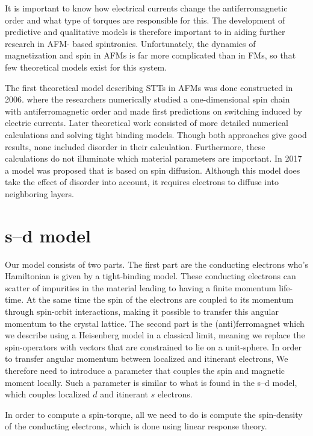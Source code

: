 It is important to know how electrical currents change the antiferromagnetic order and what
type of torques are responsible for this. The development of predictive and qualitative models is therefore important to in aiding further research in AFM- based spintronics.
Unfortunately, the dynamics of magnetization and spin in AFMs is far more complicated
than in FMs, so that few theoretical models exist for this system.

The first theoretical model describing STTs in AFMs was done constructed in 2006. where
the researchers numerically studied a one-dimensional spin chain with antiferromagnetic
order and made first predictions on switching induced by electric currents. Later
theoretical work consisted of more detailed numerical calculations and solving tight binding
models. Though both approaches give good results, none included disorder in their
calculation. Furthermore, these calculations do not illuminate which material
parameters are important. In 2017 a model was proposed that is based on spin
diffusion. Although this model does take the effect of disorder into account, it requires
electrons to diffuse into neighboring layers. 

\section{s--d model}
Our model consists of two parts. The first part are the conducting electrons who's Hamiltonian is given by a tight-binding model. These conducting electrons can scatter of impurities in the material leading to having a finite momentum life-time. At the same time the spin of the electrons are coupled to its momentum through spin-orbit interactions, making it possible to transfer this angular momentum to the crystal lattice. The second part is the (anti)ferromagnet which we describe using a Heisenberg model in a classical limit, meaning we replace the spin-operators with vectors that are constrained to lie on a unit-sphere. In order to transfer angular momentum between localized and itinerant electrons, We therefore need to introduce a parameter that couples the spin and magnetic moment locally. Such a parameter is similar to what is found in the s--d model, which couples localized $d$ and itinerant $s$ electrons. 

In order to compute a spin-torque, all we need to do is compute the spin-density of the conducting electrons, which is done using linear response theory. 

